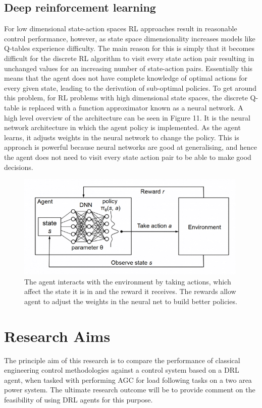 \documentclass[12pt, a4paper]{article}
\begin{document}
\subsection{Deep reinforcement learning}
For low dimensional state-action spaces RL approaches result in reasonable control performance, however, as state space dimensionality increases models like Q-tables experience difficulty. The main reason for this is simply that it becomes difficult for the discrete RL algorithm to visit every state action pair resulting in unchanged values for an increasing number of state-action pairs. Essentially this means that the agent does not have complete knowledge of optimal actions for every given state, leading to the derivation of sub-optimal policies. To get around this problem, for RL problems with high dimensional state spaces, the discrete Q-table is replaced with a function approximator known as a neural network. A high level overview of the architecture can be seen in Figure 11. It is the neural network architecture in which the agent policy is implemented. As the agent learns, it adjusts weights in the neural network to change the policy. This is approach is powerful because neural networks are good at generalising, and hence the agent does not need to visit every state action pair to be able to make good decisions.
\begin{figure}[h]
\centering
\includegraphics[height=5cm]{deep_reinforcement_learning}
\caption{The agent interacts with the environment by taking actions, which affect the state it is in and the reward it receives. The rewards allow agent to adjust the weights in the neural net to build better policies.}
\end{figure}


\section{Research Aims}
The principle aim of this research is to compare the performance of classical engineering control methodologies against a control system based on a DRL agent, when tasked with performing AGC for load following tasks on a two area power system. The ultimate research outcome will be to provide comment on the feasibility of using DRL agents for this purpose.
\end{document}
